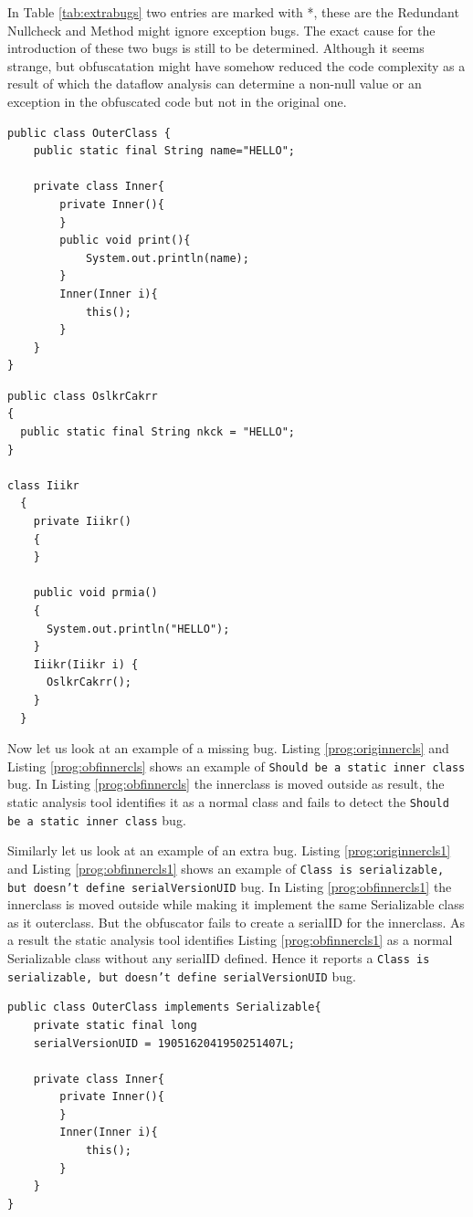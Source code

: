 \documentclass[conference]{IEEEtran}
\begin{document}
In Table \ref{tab:extrabugs} two entries are marked with *, these are the Redundant Nullcheck and Method might ignore exception bugs. The exact cause for the introduction of these two 
bugs is still to be determined. Although it seems strange, but obfuscatation might have somehow reduced the code complexity as a result of which the dataflow analysis can determine a 
non-null value or an exception in the obfuscated code but not in the original one.
\begin{tiny}
\begin{lstlisting}[frame=single]
 public class OuterClass {
	public static final String name="HELLO";
	
	private class Inner{
		private Inner(){
		}
		public void print(){
			System.out.println(name);
		}
		Inner(Inner i){
			this();
		}
	}
}
\end{lstlisting}
\end{tiny}
{}
\tiny\begin{lstlisting}[frame=single]
 public class OslkrCakrr
{
  public static final String nkck = "HELLO";
}

class Iiikr
  {
    private Iiikr()
    {
    }

    public void prmia()
    {
      System.out.println("HELLO");
    }
    Iiikr(Iiikr i) {
      OslkrCakrr();
    }
  }
\end{lstlisting}
\normalsize
Now let us look at an example of a missing bug. Listing \ref{prog:originnercls} and Listing \ref{prog:obfinnercls} shows an example of {\tt Should be a static inner class} bug. In Listing 
\ref{prog:obfinnercls} the innerclass is moved outside as result, the static analysis tool identifies it as a normal class and fails to detect the {\tt Should be a static inner class} bug.

Similarly let us look at an example of an extra bug. Listing \ref{prog:originnercls1} and Listing \ref{prog:obfinnercls1} shows an example of {\tt Class is serializable, but doesn’t 
define serialVersionUID} bug. In Listing \ref{prog:obfinnercls1} the innerclass is moved outside while making it implement the same Serializable class as it outerclass. But the obfuscator 
fails to create a serialID for the innerclass. As a result the static analysis tool identifies Listing \ref{prog:obfinnercls1} as a normal Serializable class without any serialID defined. 
Hence it reports a {\tt Class is serializable, but doesn’t define serialVersionUID} bug.
\tiny\begin{lstlisting}[frame=single]
 public class OuterClass implements Serializable{
	private static final long 
	serialVersionUID = 1905162041950251407L;
	
	private class Inner{
		private Inner(){
		}
		Inner(Inner i){
			this();
		}
	}
}
\end{lstlisting}
\normalsize
\end{document}
